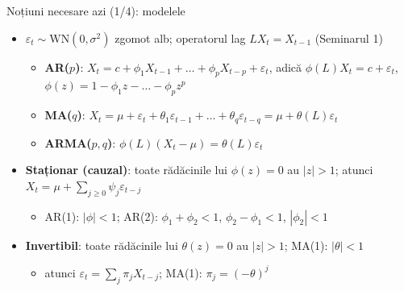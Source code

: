 \begin{frame}{Noțiuni necesare azi (1/4): modelele}
\itemsize{\small}
\begin{itemize}
    \item $\varepsilon_t \sim \mathrm{WN}(0, \sigma^2)$ zgomot alb; operatorul lag $LX_t = X_{t-1}$ (Seminarul 1)
    \begin{itemize}
        \item \textbf{AR($p$)}: $X_t = c + \phi_1X_{t-1} + \dots + \phi_pX_{t-p} + \varepsilon_t$, adică $\phi(L)X_t = c + \varepsilon_t$, $\phi(z) = 1 - \phi_1z - \dots - \phi_pz^p$
        \item \textbf{MA($q$)}: $X_t = \mu + \varepsilon_t + \theta_1\varepsilon_{t-1} + \dots + \theta_q\varepsilon_{t-q} = \mu + \theta(L)\varepsilon_t$
        \item \textbf{ARMA($p,q$)}: $\phi(L)(X_t - \mu) = \theta(L)\varepsilon_t$
    \end{itemize}
    \item \textbf{Staționar (cauzal)}: toate rădăcinile lui $\phi(z) = 0$ au $|z| > 1$; atunci $X_t = \mu + \sum_{j \ge 0}\psi_j\varepsilon_{t-j}$
    \begin{itemize}
        \item AR(1): $|\phi| < 1$; AR(2): $\phi_1 + \phi_2 < 1$, $\phi_2 - \phi_1 < 1$, $|\phi_2| < 1$
    \end{itemize}
    \item \textbf{Invertibil}: toate rădăcinile lui $\theta(z) = 0$ au $|z| > 1$; MA(1): $|\theta| < 1$
    \begin{itemize}
        \item atunci $\varepsilon_t = \sum_j\pi_jX_{t-j}$; MA(1): $\pi_j = (-\theta)^j$
    \end{itemize}
\end{itemize}
\end{frame}

